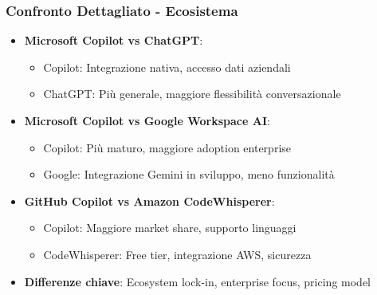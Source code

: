 \documentclass[aspectratio=169]{beamer}
\begin{document}
\begin{frame}
\frametitle{Confronto Dettagliato - Ecosistema}
\begin{itemize}
    \item \textbf{Microsoft Copilot vs ChatGPT}:
    \begin{itemize}
        \item Copilot: Integrazione nativa, accesso dati aziendali
        \item ChatGPT: Più generale, maggiore flessibilità conversazionale
    \end{itemize}
    \item \textbf{Microsoft Copilot vs Google Workspace AI}:
    \begin{itemize}
        \item Copilot: Più maturo, maggiore adoption enterprise
        \item Google: Integrazione Gemini in sviluppo, meno funzionalità
    \end{itemize}
    \item \textbf{GitHub Copilot vs Amazon CodeWhisperer}:
    \begin{itemize}
        \item Copilot: Maggiore market share, supporto linguaggi
        \item CodeWhisperer: Free tier, integrazione AWS, sicurezza
    \end{itemize}
    \item \textbf{Differenze chiave}: Ecosystem lock-in, enterprise focus, pricing model
\end{itemize}
\end{frame}
%
%
\end{document}
